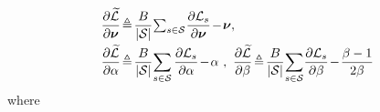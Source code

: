 \documentclass[conference]{IEEEtran}
\begin{document}
\begin{equation}
\begin{array}{l}
				\dfrac{\partial\widetilde{\mathcal{L}}}{\partial\boldsymbol{\nu}}\hspace{-0.5mm}\triangleq\hspace{-0.5mm}\dfrac{B}{|\mathcal{S}|}\hspace{-0.5mm}\sum_{s\in\mathcal{S}}\hspace{-0.5mm}\dfrac{\partial{\mathcal{L}}_s}{\partial\boldsymbol{\nu}}\hspace{-0.5mm}-\hspace{-0.5mm}\boldsymbol{\nu},
				\vspace{1mm} \\
				\displaystyle\dfrac{\partial\widetilde{\mathcal{L}}}{\partial \alpha}\hspace{-0.5mm}\triangleq\hspace{-0.5mm}\dfrac{B}{|\mathcal{S}|}\hspace{-0.5mm}\sum_{s\in\mathcal{S}}\dfrac{\partial{\mathcal{L}}_s}{\partial \alpha}\hspace{-0.5mm}-\hspace{-0.5mm}\alpha\ , \ 
				\dfrac{\partial\widetilde{\mathcal{L}}}{\partial \beta}\hspace{-0.5mm}\triangleq\hspace{-0.5mm}\dfrac{B}{|\mathcal{S}|}\hspace{-0.5mm}\sum_{s\in\mathcal{S}}\hspace{-0.5mm}\dfrac{\partial{\mathcal{L}}_s}{\partial \beta}\hspace{-0.5mm}-\hspace{-0.5mm}\dfrac{\beta-1}{2\beta}
			\end{array}
			\label{zoo}
		\end{equation}
		where
\end{document}

